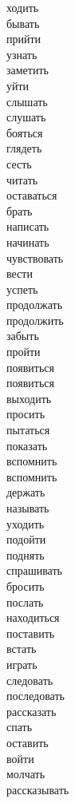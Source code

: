 \documentclass{article}
\begin{document}
\begin{multicols}{3}
ходить \\
бывать \\
прийти \\
узнать \\
заметить \\
уйти \\
слышать \\
слушать \\
бояться \\
глядеть \\
сесть \\
читать \\
оставаться \\
брать \\
написать \\
начинать \\
чувствовать \\
вести \\
успеть \\
продолжать \\
продолжить \\
забыть \\
пройти \\
появиться \\
появиться \\
выходить \\
просить \\
пытаться \\
показать \\
вспомнить \\
вспомнить \\
держать \\
называть \\
уходить \\
подойти \\
поднять \\
спрашивать \\
бросить \\
послать \\
находиться \\
поставить \\
встать \\
играть \\
следовать \\
последовать \\
рассказать \\
спать \\
оставить \\
войти \\
молчать \\
рассказывать \\

\end{multicols}
\end{document}
